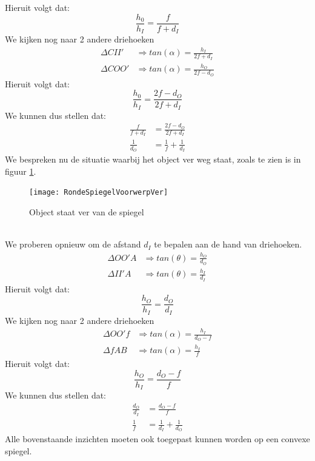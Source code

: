 \documentclass[a4paper,kul]{kulakarticle} %
\begin{document}
Hieruit volgt dat:
\begin{equation*}
	\frac{h_0}{h_I}=\frac{f}{f+d_I}
\end{equation*}
We kijken nog naar 2 andere driehoeken
\begin{align*}
	\Delta CII'&\Rightarrow tan(\alpha)= \frac{h_I}{2f+d_I}\\
	\Delta COO'&\Rightarrow tan(\alpha)= \frac{h_O}{2f-d_O}
\end{align*}
Hieruit volgt dat:
\begin{equation*}
	\frac{h_0}{h_I}=\frac{2f-d_O}{2f+d_I}
\end{equation*}
We kunnen dus stellen dat:
\begin{align*}
	\frac{f}{f+d_I}&=\frac{2f-d_O}{2f+d_I}\\
	\frac{1}{d_O} &= \frac{1}{f}+\frac{1}{d_I}
\end{align*}
\newpage
We bespreken nu de situatie waarbij het object ver weg staat, zoals te zien is in figuur \ref{fig:rondespiegelvoorwerpver}.
\begin{figure}[h]
	\centering
	\texttt{[image: RondeSpiegelVoorwerpVer]}
	\caption[Spiegel ver]{Object staat ver van de spiegel}
	\label{fig:rondespiegelvoorwerpver}
\end{figure} \\
We proberen opnieuw om de afstand $d_I$ te bepalen aan de hand van driehoeken.
\begin{align*}
	\Delta OO'A&\Rightarrow tan(\theta)=\frac{h_O}{d_O}\\
	\Delta II'A&\Rightarrow tan(\theta)= \frac{h_I}{d_I}
\end{align*}
Hieruit volgt dat:
\begin{equation*}
	\frac{h_O}{h_I}=\frac{d_O}{d_I}
\end{equation*}
We kijken nog naar 2 andere driehoeken
\begin{align*}
	\Delta OO'f&\Rightarrow tan(\alpha)=\frac{h_I}{d_O-f}\\
	\Delta fAB&\Rightarrow tan(\alpha)= \frac{h_I}{f}
\end{align*}
Hieruit volgt dat:
\begin{equation*}
	\frac{h_O}{h_I}=\frac{d_O-f}{f}
\end{equation*}
We kunnen dus stellen dat:
\begin{align*}
	\frac{d_O}{d_I}&=\frac{d_O-f}{f}\\
	\frac{1}{f}&= \frac{1}{d_I}+\frac{1}{d_O}
\end{align*}
Alle bovenstaande inzichten moeten ook toegepast kunnen worden op een convexe spiegel. 
\newpage
\end{document}
